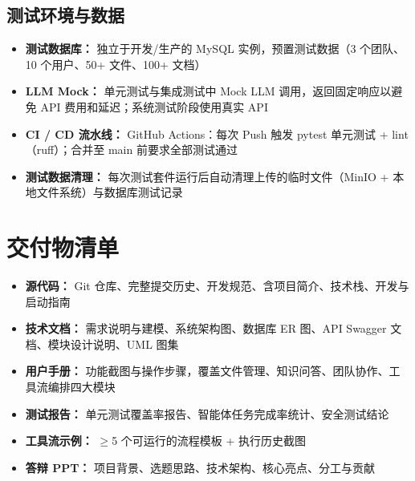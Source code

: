 \documentclass[a4paper,zihao=-4]{ctexart}
\begin{document}
\subsection{测试环境与数据}

\begin{itemize}
  \item \textbf{测试数据库：} 独立于开发/生产的 MySQL 实例，预置测试数据（3 个团队、10 个用户、50+ 文件、100+
        文档）
  \item \textbf{LLM Mock：} 单元测试与集成测试中 Mock LLM 调用，返回固定响应以避免 API
        费用和延迟；系统测试阶段使用真实 API
  \item \textbf{CI / CD 流水线：} GitHub Actions：每次 Push 触发 pytest 单元测试 +
        lint（ruff）；合并至 main 前要求全部测试通过
  \item \textbf{测试数据清理：} 每次测试套件运行后自动清理上传的临时文件（MinIO + 本地文件系统）与数据库测试记录
\end{itemize}

\section{交付物清单}

\begin{itemize}
  \item \textbf{源代码：} Git
        仓库、完整提交历史、开发规范、含项目简介、技术栈、开发与启动指南
  \item \textbf{技术文档：} 需求说明与建模、系统架构图、数据库 ER 图、API Swagger 文档、模块设计说明、UML 图集
  \item \textbf{用户手册：} 功能截图与操作步骤，覆盖文件管理、知识问答、团队协作、工具流编排四大模块
  \item \textbf{测试报告：} 单元测试覆盖率报告、智能体任务完成率统计、安全测试结论
  \item \textbf{工具流示例：} $\geq$5 个可运行的流程模板 + 执行历史截图
  \item \textbf{答辩 PPT：} 项目背景、选题思路、技术架构、核心亮点、分工与贡献
\end{itemize}
\end{document}
